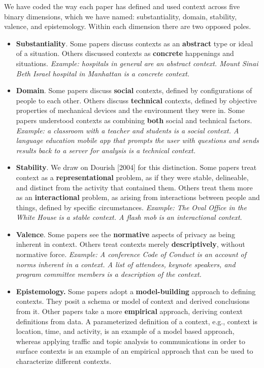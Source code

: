 \documentclass[../thesis.tex]{subfiles}
\newcommand\liststyleWWNumii{%
\renewcommand\labelitemi{${\bullet}$}
\renewcommand\labelitemii{${\circ}$}
\renewcommand\labelitemiii{${\blacksquare}$}
\renewcommand\labelitemiv{${\bullet}$}
}
\begin{document}
\bigskip

We have coded the way each paper has defined and used context across
five binary dimensions, which we have named: substantiality, domain,
stability, valence, and epistemology. Within each dimension there are
two opposed poles.


\bigskip

\liststyleWWNumii
\begin{itemize}
\item \textbf{Substantiality}. Some papers discuss contexts as an
\textbf{abstract} type or ideal of a situation. Others discussed
contexts as \textbf{concrete} happenings and situations.
\textit{Example: hospitals in general are an abstract context. Mount
Sinai Beth Israel hospital in Manhattan is a concrete context.}
\item \textbf{Domain}. Some papers discuss \textbf{social} contexts,
defined by configurations of people to each other. Others discuss
\textbf{technical} contexts, defined by objective properties of
mechanical devices and the environment they were in. Some papers
understood contexts as combining \textbf{both} social and technical
factors. \textit{Example: a classroom with a teacher and students is a
social context. A language education mobile app that prompts the user
with questions and sends results back to a server for analysis is a
technical context.}
\item \textbf{Stability}. We draw on Dourish [2004] for this
distinction. Some papers treat context as a \textbf{representational}
problem, as if they were stable, delineable, and distinct from the
activity that contained them. Others treat them more as an
\textbf{interactional} problem, as arising from interactions between
people and things, defined by specific circumstances. \textit{Example:
The Oval Office in the White House is a stable context. A flash mob is
an interactional context}.
\item \textbf{Valence}. Some papers see the \textbf{normative} aspects
of privacy as being inherent in context. Others treat contexts merely
\textbf{descriptively}, without normative force. \textit{Example: A
conference Code of Conduct is an account of norms inherent in a
context. A list of attendees, keynote speakers, and program committee
members is a description of the context.}
\item \textbf{Epistemology. }Some papers adopt a \textbf{model-building}
approach to defining contexts. They posit a schema or model of context
and derived conclusions from it. Other papers take a more
\textbf{empirical} approach, deriving context definitions from data. A
parameterized definition of a context, e.g., context is location, time,
and activity, is an example of a model based approach, whereas applying
traffic and topic analysis to communications in order to surface
contexts is an example of an empirical approach that can be used to
characterize different contexts.
\end{itemize}
\end{document}
